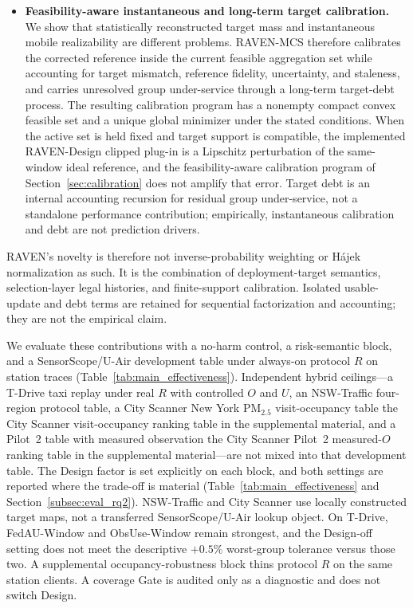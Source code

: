 \documentclass[letterpaper,journal]{IEEEtran}
\begin{document}
\begin{itemize}
    \item \textbf{Feasibility-aware instantaneous and long-term target
    calibration.}
    We show that statistically reconstructed target mass and instantaneous
    mobile realizability are different problems.  RAVEN-MCS therefore
    calibrates the corrected reference inside the current feasible aggregation
    set while accounting for target mismatch, reference fidelity, uncertainty,
    and staleness, and carries unresolved group under-service through a
    long-term target-debt process.  The resulting calibration program has a
    nonempty compact convex feasible set and a unique global minimizer under the
    stated conditions.  When the active set is held fixed and target support is
    compatible, the implemented RAVEN-Design clipped plug-in is a Lipschitz perturbation of
    the same-window ideal reference, and the feasibility-aware calibration
    program of Section~\ref{sec:calibration} does not amplify that error.
    Target debt is an internal accounting recursion for residual
    group under-service, not a standalone performance contribution;
    empirically, instantaneous calibration and debt are not prediction
    drivers.
\end{itemize}

RAVEN's novelty is therefore not inverse-probability weighting or H\'ajek
normalization as such.  It is the combination of deployment-target semantics,
selection-layer legal histories, and finite-support calibration.
Isolated usable-update and debt terms are retained for sequential
factorization and accounting; they are not the empirical claim.

We evaluate these contributions with a no-harm control, a risk-semantic
block, and a SensorScope/U-Air development table under always-on protocol
$R$ on station traces (Table~\ref{tab:main_effectiveness}).
Independent hybrid ceilings---a T-Drive taxi replay under real $R$ with
controlled $O$ and $U$, an NSW-Traffic four-region protocol table, a
City Scanner New York {PM}$_{2.5}$ visit-occupancy table
the City Scanner visit-occupancy ranking table in the supplemental material, and a Pilot~2 table with measured
observation the City Scanner Pilot~2 measured-$O$ ranking table in the supplemental material---are not mixed
into that development table.
The Design factor is set explicitly on each block, and both settings are
reported where the trade-off is material
(Table~\ref{tab:main_effectiveness} and Section~\ref{subsec:eval_rq2}).
NSW-Traffic and City Scanner use locally constructed target maps, not a
transferred SensorScope/U-Air lookup object.
On T-Drive, FedAU-Window and
ObsUse-Window remain strongest, and the Design-off setting does not meet the
descriptive $+0.5\%$ worst-group tolerance versus those two.
A supplemental occupancy-robustness block thins protocol $R$ on the same
station clients.  A coverage Gate is audited only as a diagnostic and
does not switch Design.
\end{document}
